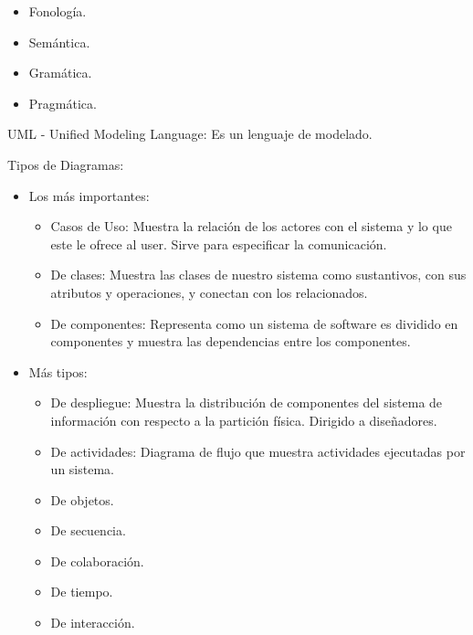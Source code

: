 \documentclass[12pt, twoside, openright]{report} %
\begin{document}
    \begin{itemize}
    
    \item
      Fonología.
    \item
      Semántica.
    \item
      Gramática.
    \item
      Pragmática.
    \end{itemize}

	UML - Unified Modeling Language: Es un lenguaje de modelado.

	Tipos de Diagramas:

    \begin{itemize}
    
    \item
      Los más importantes:

      \begin{itemize}
      \item
        Casos de Uso: Muestra la relación de los actores con el sistema
        y lo que este le ofrece al user. Sirve para especificar la
        comunicación.
      \item
        De clases: Muestra las clases de nuestro sistema como
        sustantivos, con sus atributos y operaciones, y conectan con los
        relacionados.
      \item
        De componentes: Representa como un sistema de software es
        dividido en componentes y muestra las dependencias entre los
        componentes.
      \end{itemize}
    \item
      Más tipos:

      \begin{itemize}
      \item
        De despliegue: Muestra la distribución de componentes del
        sistema de información con respecto a la partición física.
        Dirigido a diseñadores.
      \item
        De actividades: Diagrama de flujo que muestra actividades
        ejecutadas por un sistema.
      \item
        De objetos.
      \item
        De secuencia.
      \item
        De colaboración.
      \item
        De tiempo.
      \item
        De interacción.
      \end{itemize}
    \end{itemize}
\end{document}
